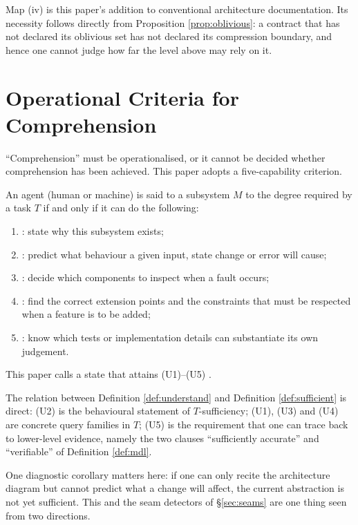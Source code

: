 Map (iv) is this paper's addition to conventional architecture documentation. Its necessity
follows directly from Proposition \ref{prop:oblivious}: a contract that has not declared its
oblivious set has not declared its compression boundary, and hence one cannot judge how far
the level above may rely on it.

\section{Operational Criteria for Comprehension}\label{sec:five-capabilities}

``Comprehension'' must be operationalised, or it cannot be decided whether comprehension has
been achieved. This paper adopts a five-capability criterion.

\begin{definition}\label{def:understand}
An agent (human or machine) is said to  a subsystem $M$ to the degree
required by a task $T$ if and only if it can do the following:
\begin{enumerate}[label=(U\arabic*)]
\item {}: state why this subsystem exists;
\item {}: predict what behaviour a given input, state change or error will cause;
\item {}: decide which components to inspect when a fault occurs;
\item {}: find the correct extension points and the constraints that must be
      respected when a feature is to be added;
\item {}: know which tests or implementation details can substantiate its own
      judgement.
\end{enumerate}
This paper calls a state that attains (U1)--(U5) .
\end{definition}

The relation between Definition \ref{def:understand} and Definition \ref{def:sufficient} is
direct: (U2) is the behavioural statement of $T$-sufficiency; (U1), (U3) and (U4) are concrete
query families in $T$; (U5) is the requirement that one can trace back to lower-level evidence,
namely the two clauses ``sufficiently accurate'' and ``verifiable'' of Definition
\ref{def:mdl}.

One diagnostic corollary matters here: if one can only recite the architecture diagram but
cannot predict what a change will affect, the current abstraction is not yet sufficient. This
and the seam detectors of \S\ref{sec:seams} are one thing seen from two directions.

